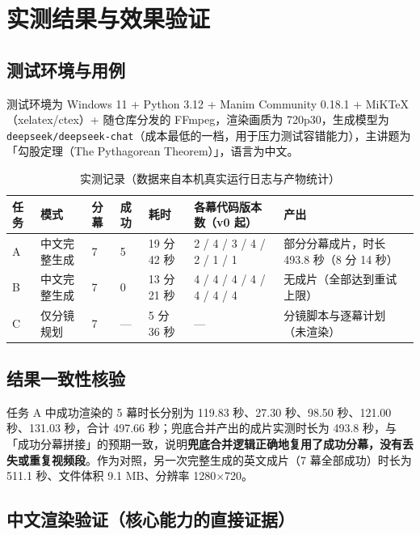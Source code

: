\documentclass[11pt,a4paper]{ctexart}
\begin{document}
\section{实测结果与效果验证}

\subsection{测试环境与用例}

测试环境为 Windows 11 + Python 3.12 + Manim Community 0.18.1 + MiKTeX（xelatex/ctex）+ 随仓库分发的 FFmpeg，渲染画质为 720p30，生成模型为 \texttt{deepseek/deepseek-chat}（成本最低的一档，用于压力测试容错能力），主讲题为「勾股定理（The Pythagorean Theorem）」，语言为中文。

\begin{table}[htbp]
\centering
\small
\caption{实测记录（数据来自本机真实运行日志与产物统计）}
\begin{tabularx}{\textwidth}{@{}p{1.1cm} p{1.5cm} p{1.2cm} p{1.1cm} p{1.3cm} p{2.6cm} X@{}}
\toprule
\textbf{任务} & \textbf{模式} & \textbf{分幕} & \textbf{成功} & \textbf{耗时} & \textbf{各幕代码版本数（v0 起）} & \textbf{产出} \\
\midrule
A & 中文完整生成 & 7 & 5 & 19 分 42 秒 & 2 / 4 / 3 / 4 / 2 / 1 / 1 & 部分分幕成片，时长 493.8 秒（8 分 14 秒） \\
B & 中文完整生成 & 7 & 0 & 13 分 21 秒 & 4 / 4 / 4 / 4 / 4 / 4 / 4 & 无成片（全部达到重试上限） \\
C & 仅分镜规划 & 7 & --- & 5 分 36 秒 & --- & 分镜脚本与逐幕计划（未渲染） \\
\bottomrule
\end{tabularx}
\end{table}

\subsection{结果一致性核验}

任务 A 中成功渲染的 5 幕时长分别为 119.83 秒、27.30 秒、98.50 秒、121.00 秒、131.03 秒，合计 497.66 秒；兜底合并产出的成片实测时长为 493.8 秒，与「成功分幕拼接」的预期一致，说明\textbf{兜底合并逻辑正确地复用了成功分幕，没有丢失或重复视频段}。作为对照，另一次完整生成的英文成片（7 幕全部成功）时长为 511.1 秒、文件体积 9.1 MB、分辨率 1280$\times$720。

\subsection{中文渲染验证（核心能力的直接证据）}
\end{document}
